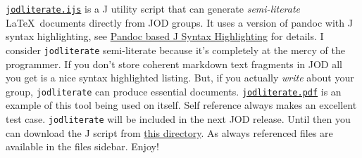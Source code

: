\href{https://www.box.com/s/1fcil5s5zhvlxzzwpjqn}{\texttt{jodliterate.ijs}}
is a J utility script that can generate \emph{semi-literate} \LaTeX\
documents directly from JOD groups. It uses a version of pandoc with J
syntax highlighting, see
\href{http://bakerjd99.wordpress.com/2012/09/20/pandoc-based-j-syntax-highlighting/}{Pandoc
based J Syntax Highlighting} for details. I consider
\texttt{jodliterate} semi-literate because it's completely at the mercy
of the programmer. If you don't store coherent markdown text fragments
in JOD all you get is a nice syntax highlighted listing. But, if you
actually \emph{write} about your group, \texttt{jodliterate} can produce
essential documents.
\href{https://www.box.com/s/rhs9kfmim65vm6sv5p8y}{\texttt{jodliterate.pdf}}
is an example of this tool being used on itself. Self reference always
makes an excellent test case. \texttt{jodliterate} will be included in
the next JOD release. Until then you can download the J script from
\href{https://www.box.com/s/eb537470b25ab230a0ab}{this directory}. As always
referenced files are available in the files sidebar. Enjoy!




%